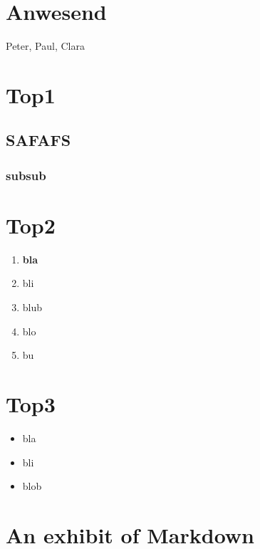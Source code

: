 \hypertarget{anwesend}{%
\section{Anwesend}\label{anwesend}}

Peter, Paul, Clara

\hypertarget{top1}{%
\section{Top1}\label{top1}}

\Blindtext[1][3]

\hypertarget{safafs}{%
\subsection{SAFAFS}\label{safafs}}

\Blindtext[2][7]

\hypertarget{subsub}{%
\subsubsection{subsub}\label{subsub}}

\Blindtext[2][5]

\hypertarget{top2}{%
\section{Top2}\label{top2}}

\begin{enumerate}
\def\labelenumi{\arabic{enumi}.}
\item
  \textbf{bla} \Blindtext[1][5]
\item
  bli
\item
  blub
\item
  blo
\item
  bu
\end{enumerate}

\hypertarget{top3}{%
\section{Top3}\label{top3}}

\begin{itemize}
\item
  bla
\item
  bli
\item
  blob
\end{itemize}

\hypertarget{an-exhibit-of-markdown}{%
\section{An exhibit of Markdown}\label{an-exhibit-of-markdown}}

